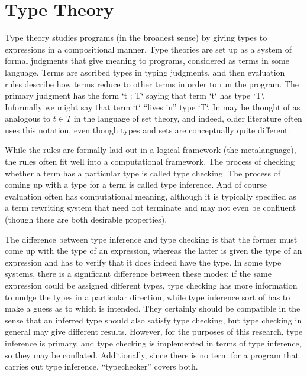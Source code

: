 \documentclass[11pt, twoside, reqno]{book}
\begin{document}

\section{Type Theory}
\label{TT}

Type theory studies programs (in the broadest sense) by giving types to expressions in a compositional manner.
Type theories are set up as a system of formal judgments that give meaning to programs, considered as terms in some language.
Terms are ascribed types in typing judgments, and then evaluation rules describe how terms reduce to other terms in order to run the program.
The primary judgment has the form \inHS`t : T` saying that term \inHS`t` has type \inHS`T`.
Informally we might say that term \inHS`t` ``lives in'' type \inHS`T`.
In may be thought of as analogous to \(t \in T\) in the language of set theory, and indeed, older literature often uses this notation, even though types and sets are conceptually quite different.

While the rules are formally laid out in a logical framework (the metalanguage), the rules often fit well into a computational framework.
The process of checking whether a term has a particular type is called type checking.
The process of coming up with a type for a term is called type inference.
And of course evaluation often has computational meaning, although it is typically specified as a term rewriting system that need not terminate and may not even be confluent (though these are both desirable properties).

The difference between type inference and type checking is that the former must come up with the type of an expression, whereas the latter is given the type of an expression and has to verify that it does indeed have the type.
In some type systems, there is a significant difference between these modes: if the same expression could be assigned different types, type checking has more information to nudge the types in a particular direction, while type inference sort of has to make a guess as to which is intended.
They certainly should be compatible in the sense that an inferred type should also satisfy type checking, but type checking in general may give different results.
However, for the purposes of this research, type inference is primary, and type checking is implemented in terms of type inference, so they may be conflated.
Additionally, since there is no term for a program that carries out type inference, ``typechecker'' covers both.
\end{document}
